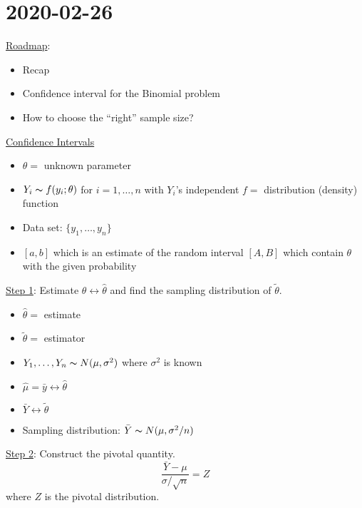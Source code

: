 \section{2020-02-26}
\underline{Roadmap}:
\begin{itemize}
    \item Recap
    \item Confidence interval for the Binomial problem
    \item How to choose the ``right'' sample size?
\end{itemize}
\underline{Confidence Intervals}
\begin{itemize}
    \item $ \theta= $ unknown parameter
    \item $ Y_i \thicksim f(y_i;\theta) $ for $ i=1,\ldots ,n $ with $ Y_i $'s independent
          \subitem $ f= $ distribution (density) function
    \item Data set: $ \{y_1,\ldots ,y_n\} $
    \item $ [a,b] $ which is an estimate of the random interval $ [A,B] $
          which contain $ \theta $ with the given probability
\end{itemize}

\underline{Step 1}: Estimate $ \theta \longleftrightarrow \hat{\theta} $ and
find the sampling distribution of $ \tilde{\theta} $.
\begin{itemize}
    \item $ \hat{\theta}= $ estimate
    \item $ \tilde{\theta}= $ estimator
    \item $ Y_1,\ldots ,Y_n \thicksim N(\mu,\sigma^2) $ where $ \sigma^2 $ is known
    \item $ \hat{\mu}=\bar{y} \longleftrightarrow \hat{\theta} $
    \item $ \bar{Y} \longleftrightarrow \tilde{\theta} $
    \item Sampling distribution: $ \bar{Y}\thicksim N(\mu,\sigma^2/n) $
\end{itemize}
\underline{Step 2}: Construct the pivotal quantity.
\[ \frac{\bar{Y}-\mu}{\sigma/\sqrt{n}}=Z \]
where $ Z $ is the pivotal distribution.

